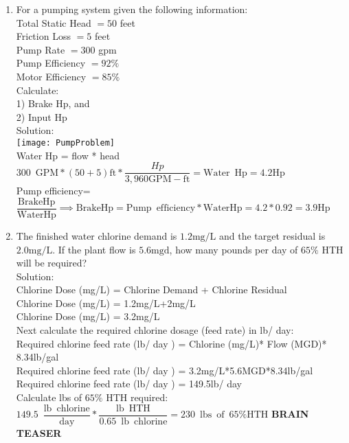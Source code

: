 \documentclass{article}
\begin{document}
\begin{enumerate}
\newpage
\item    For a pumping system given the following information: \\
Total Static Head $=50$ feet\\
Friction Loss $=5$ feet\\
Pump Rate $=300$ gpm\\
Pump Efficiency $=92 \%$\\
Motor Efficiency $=85 \%$\\
Calculate: \\
1) Brake Hp, and \\
2) Input Hp\\
\vspace{0.3cm}
Solution:\\
 \vspace{0.4cm}\texttt{[image: PumpProblem]}\\
 \vspace{0.2cm}
Water Hp = flow * head\\
$300 \enspace \mathrm{GPM}*(50+5)\mathrm{ft}*\dfrac{Hp}{3,960 \mathrm{GPM-ft}}=\boxed{\mathrm{Water \enspace Hp} = 4.2\mathrm{Hp}}$\\
\vspace{0.4cm}
Pump efficiency=$\dfrac{\mathrm{Brake Hp}}{\mathrm{Water Hp}} \implies \mathrm{Brake Hp}=\mathrm{Pump \enspace efficiency}*\mathrm{Water Hp}=4.2*0.92=\boxed{3.9 \mathrm{Hp}}$
 \vspace{0.2cm}
 
\newpage
\item The finished water chlorine demand is $1.2 \mathrm{mg} / \mathrm{L}$ and the target residual is $2.0 \mathrm{mg} / \mathrm{L}$. If the plant flow is $5.6 \mathrm{mgd}$, how many pounds per day of $65 \%$ HTH will be required?\\
\vspace{0.3cm}
Solution:\\
Chlorine Dose (mg/L) = Chlorine Demand + Chlorine Residual\\
Chlorine Dose (mg/L) = 1.2mg/L+2mg/L\\
Chlorine Dose (mg/L) = 3.2mg/L\\
Next calculate the required chlorine dosage (feed rate) in lb/ day:\\
Required chlorine feed rate (lb/ day ) = Chlorine (mg/L)* Flow (MGD)* 8.34lb/gal\\
Required chlorine feed rate (lb/ day ) = 3.2mg/L*5.6MGD*8.34lb/gal\\
Required chlorine feed rate (lb/ day ) = 149.5lb/ day\\
Calculate lbs of $65 \%$ HTH required: $149.5 \enspace \dfrac{\mathrm{lb \enspace chlorine}}{\mathrm{day}}*\dfrac{\mathrm{lb\enspace  HTH}}{0.65 \enspace \mathrm{lb \enspace chlorine}}=\boxed{230 \enspace \mathrm{lbs \enspace of \enspace} 65\% \mathrm{HTH}}$
 \newpage
 \textbf{BRAIN TEASER}
 

\end{enumerate}
\end{document}
